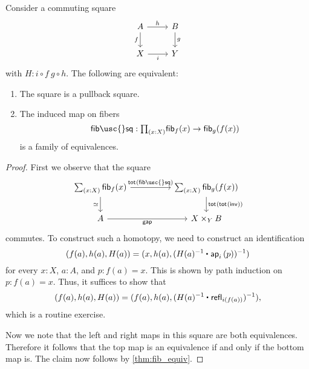 \begin{thm}\label{cor:pb_fibequiv}
Consider a commuting square
\begin{equation*}
\begin{tikzcd}
A \arrow[d,swap,"f"] \arrow[r,"h"] & B \arrow[d,"g"] \\
X \arrow[r,swap,"i"] & Y
\end{tikzcd}
\end{equation*}
with $H: i\circ f ~ g \circ h$. The following are equivalent:
\begin{enumerate}
\item The square is a pullback square.
\item The induced map on fibers
\begin{equation*}
\mathsf{fib\usc{}sq} : \prd{x:X} \fib{f}{x} \to \fib{g}{f(x)}
\end{equation*}
is a family of equivalences.
\end{enumerate}
\end{thm}

\begin{proof}
First we observe that the square
\begin{equation*}
\begin{tikzcd}[column sep=huge]
\sm{x:X}\fib{f}{x} \arrow[d,swap,"\eqvsym"] \arrow[r,"\total{\mathsf{fib\usc{}sq}}"] &
\sm{x:X}\fib{g}{f(x)} \arrow[d,"\total{\total{\mathsf{inv}}}"] \\
A \arrow[r,swap,"\mathsf{gap}"] & X \times_Y B
\end{tikzcd}
\end{equation*}
commutes. To construct such a homotopy, we need to construct an identification
\begin{equation*}
(f(a),h(a),H(a))=(x,h(a),(\ct{H(a)^{-1}}{\ap{i}{p}})^{-1})
\end{equation*}
for every $x : X$, $a : A$, and $p : f(a) = x$. This is shown by path induction on $p : f(a)=x$. Thus, it suffices to show that
\begin{equation*}
(f(a),h(a),H(a))=(f(a),h(a),(\ct{H(a)^{-1}}{\refl{i(f(a))}})^{-1}),
\end{equation*}
which is a routine exercise. 

Now we note that the left and right maps in this square are both equivalences. Therefore it follows that the top map is an equivalence if and only if the bottom map is. The claim now follows by \cref{thm:fib_equiv}.
\end{proof}

